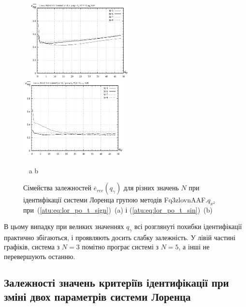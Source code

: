 \begin{figure}[ht!]
  \begin{center}
    ~ \hfill
    \includegraphics[width=0.49\textwidth]{p/cha/lor/Fq3zlovnAAF/N/lor_Fq3zlovnAAF_qx2_p_qg_e_ree_sign.png}
    \hfill
    \includegraphics[width=0.49\textwidth]{p/cha/lor/Fq3zlovnAAF/N/lor_Fq3zlovnAAF_qx2_p_qg_e_ree_sin.png}
    \hfill ~
  \end{center}
  \vspace{-1.0ex}
  \begin{center}
    ~ \hfill a \hfill\hfill b \hfill ~
  \end{center}
  \vspace{-1.5ex}
\caption{Сімейства залежностей $ \overline{e}_{ree} (q_\gamma) $ для різних значень
  $ N $ при ідентифікації системи Лоренца групою методів Fq3zlovnAAF.$q_{x^2} $ при~(\ref{atu:eq:lor_po_t_sign})~(a) і (\ref{atu:eq:lor_po_t_sin})~(b)}
\label{atu:f:lor_N_ree}
\end{figure}

В цьому випадку при великих значеннях
$ q_\gamma $ всі розглянуті похибки ідентифікації практично
збігаються, і проявляють досить слабку залежність. У лівій
частині графіків, система з
$ N = 3 $ помітно програє системі з
$ N = 5 $, а інші не перевершують останню.




\subsection{Залежності значень критеріїв ідентифікації при зміні двох параметрів системи Лоренца} %

